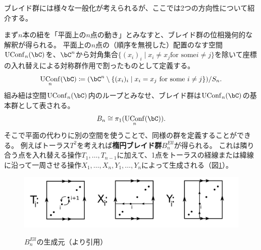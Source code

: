 \documentclass[uplatex,11pt,a4paper,dvipdfmx]{jsarticle}
\numberwithin{equation}{section}
\numberwithin{figure}{section}
\theoremstyle{definition}
\DeclareMathOperator{\UConf}{UConf}
\begin{document}
ブレイド群には様々な一般化が考えられるが、ここでは2つの方向性について紹介する。

まず$n$本の紐を「平面上の$n$点の動き」とみなすと、ブレイド群の位相幾何的な解釈が得られる。
平面上の$n$点の（順序を無視した）配置のなす空間$\UConf_n(\bC)$を、$\bC^n$から対角集合$\{(x_i)_i \mid x_i \neq x_j \text{for some} i \neq j\}$を除いて座標の入れ替えによる対称群作用で割ったものとして定義する。
\begin{equation}
    \UConf_n(\bC) \coloneq (\bC^n \setminus \{(x_i)_i \mid x_i = x_j \text{ for some } i \neq j\}) / S_n.
\end{equation}
組み紐は空間$\UConf_n(\bC)$内のループとみなせ、ブレイド群は$\UConf_n(\bC)$の基本群として表される。
\begin{equation}
    B_n \cong \pi_1(\UConf_n(\bC)).
\end{equation}
そこで平面の代わりに別の空間を使うことで、同様の群を定義することができる。
例えばトーラス$T^2$を考えれば\textbf{楕円ブレイド群}$B^{Ell}_n$が得られる。
これは隣り合う点を入れ替える操作$T_1, \dots, T_{n-1}$に加えて、1点をトーラスの経線または緯線に沿って一周させる操作$X_1, \dots, X_n, Y_1, \dots, Y_n$によって生成される（図\ref{fig:generator-for-elliptic-braid-group}）。
\begin{figure}[htbp]
    \begin{center}
        \includegraphics[width=150mm]{../images/elliptic_braid_group.png}
        \label{fig:generator-for-elliptic-braid-group}
        \caption{$B^{Ell}_n$の生成元（\cite{MR2507111}より引用）}
    \end{center}
\end{figure}
\end{document}
